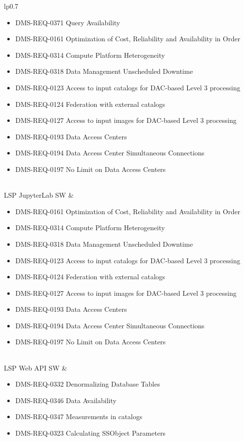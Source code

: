 \begin{xtabular}{lp{0.7\textwidth}}
\begin{itemize}
\item DMS-REQ-0371 Query Availability
\item DMS-REQ-0161 Optimization of Cost, Reliability and Availability in Order
\item DMS-REQ-0314 Compute Platform Heterogeneity
\item DMS-REQ-0318 Data Management Unscheduled Downtime
\item DMS-REQ-0123 Access to input catalogs for DAC-based Level 3 processing
\item DMS-REQ-0124 Federation with external catalogs
\item DMS-REQ-0127 Access to input images for DAC-based Level 3 processing
\item DMS-REQ-0193 Data Access Centers
\item DMS-REQ-0194 Data Access Center Simultaneous Connections
\item DMS-REQ-0197 No Limit on Data Access Centers
\end{itemize} \\ \hline
LSP JupyterLab SW &
\begin{itemize}DMS-REQ-0119 DAC resource allocation for Level 3 processing
\item DMS-REQ-0161 Optimization of Cost, Reliability and Availability in Order
\item DMS-REQ-0314 Compute Platform Heterogeneity
\item DMS-REQ-0318 Data Management Unscheduled Downtime
\item DMS-REQ-0123 Access to input catalogs for DAC-based Level 3 processing
\item DMS-REQ-0124 Federation with external catalogs
\item DMS-REQ-0127 Access to input images for DAC-based Level 3 processing
\item DMS-REQ-0193 Data Access Centers
\item DMS-REQ-0194 Data Access Center Simultaneous Connections
\item DMS-REQ-0197 No Limit on Data Access Centers
\end{itemize} \\ \hline
LSP Web API SW &
\begin{itemize}DMS-REQ-0331 Computing Derived Quantities
\item DMS-REQ-0332 Denormalizing Database Tables
\item DMS-REQ-0346 Data Availability
\item DMS-REQ-0347 Measurements in catalogs
\item DMS-REQ-0323 Calculating SSObject Parameters

\end{itemize}
\end{xtabular}
